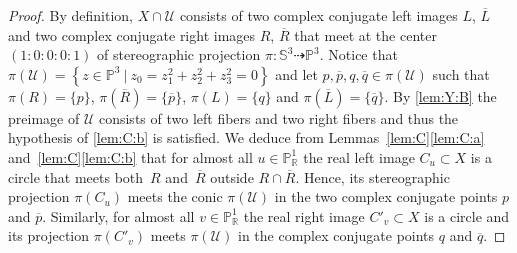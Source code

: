 \documentclass[11pt]{article}
\newcommand{\RL}[2]{\Cref{lem:#1}\ref{lem:#1:#2}}
\newcommand{\RLS}[4]{Lemmas~\ref{lem:#1}\ref{lem:#1:#2} and~\ref{lem:#3}\ref{lem:#3:#4}}
\newcommand{\R}{\mathbb{R}}
\renewcommand{\P}{\mathbb{P}}
\renewcommand{\S}{\mathbb{S}}
\newcommand{\cU}{\mathcal{U}}
\newcommand{\oL}{{\overline{L}}}
\newcommand{\oR}{{\overline{R}}}
\newcommand{\op}{{\overline{p}}}
\newcommand{\oq}{{\overline{q}}}
\renewcommand{\c}{\colon}
\newcommand{\dto}{\dasharrow}
\newcommand{\set}[2]{\left\{#1 ~|~ #2\right\}}
\newcommand{\st}{such that }
\begin{document}
\begin{proof}
By definition, $X\cap\cU$ consists of two complex conjugate left images $L$, $\oL$
and two complex conjugate right images $R$, $\oR$ that meet at the center
$(1:0:0:0:1)$ of stereographic projection $\pi\c\S^3\dto\P^3$.
Notice that $\pi(\cU)=\set{z\in\P^3}{z_0=z_1^2+z_2^2+z_3^2=0}$ and
let $p,\op,q,\oq\in\pi(\cU)$ \st $\pi(R)=\{p\}$, $\pi(\oR)=\{\op\}$,  $\pi(L)=\{q\}$ and $\pi(\oL)=\{\oq\}$.
By \RL{Y}{B} the preimage of $\cU$ consists of two left fibers and two right fibers
and thus the hypothesis of \RL{C}{b} is satisfied.
We deduce from \RLS{C}{a}{C}{b} that
for almost all $u\in\P^1_\R$ the real left image $C_u\subset X$
is a circle that meets both~$R$ and~$\oR$ outside $R\cap \oR$.
Hence, its stereographic projection $\pi(C_u)$ meets the conic $\pi(\cU)$
in the two complex conjugate points $p$ and $\op$.
Similarly, for almost all $v\in\P^1_\R$ the real right image
$C'_v\subset X$ is a circle and its projection $\pi(C'_v)$ meets $\pi(\cU)$ in
the complex conjugate points $q$ and $\oq$.


\end{proof}
\end{document}
